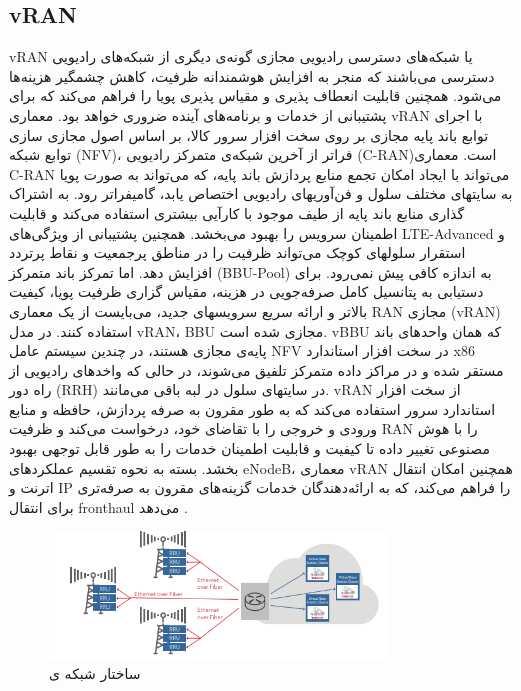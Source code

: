 \subsection{vRAN}
vRAN یا شبکه‌های دسترسی رادیویی مجازی
گونه‌ی دیگری از شبکه‌های رادیویی دسترسی می‌باشند که منجر به افزایش هوشمندانه ظرفیت، کاهش چشمگیر هزینه‌ها می‌شود. همچنین قابلیت انعطاف پذیری و مقیاس پذیری پویا را فراهم می‌کند که برای پشتیبانی از خدمات و برنامه‌های آینده ضروری خواهد بود.
معماری vRAN با اجرای توابع باند پایه مجازی بر روی سخت افزار سرور کالا، بر اساس اصول مجازی سازی توابع شبکه (NFV)، فراتر از آخرین شبکه‌ی  متمرکز رادیویی (C-RAN)است.
معماری C-RAN می‌تواند با ایجاد امکان تجمع منابع پردازش باند پایه، که می‌تواند به صورت پویا به سایتهای مختلف سلول و فن‌آوریهای رادیویی اختصاص یابد، گامیفراتر رود.
به اشتراک گذاری منابع باند پایه از طیف موجود با کارآیی بیشتری استفاده می‌کند و قابلیت اطمینان سرویس را بهبود می‌بخشد.
همچنین پشتیبانی از ویژگی‌های LTE-Advanced و استقرار سلولهای کوچک  می‌تواند ظرفیت را در مناطق پرجمعیت و نقاط پرتردد افزایش دهد.
اما تمرکز باند متمرکز (BBU-Pool) به اندازه کافی پیش نمی‌رود.
برای دستیابی به پتانسیل کامل صرفه‌جویی در هزینه، مقیاس گزاری ظرفیت پویا، کیفیت بالاتر و ارائه سریع سرویسهای جدید، می‌بایست از یک معماری RAN مجازی (vRAN) استفاده کنند. در مدل vRAN،
BBU 
مجازی شده است.
vBBU
که همان واحدهای باند پایه‌ی مجازی هستند، در چندین سیستم عامل NFV در سخت افزار استاندارد x86 مستقر شده و در مراکز داده متمرکز تلفیق می‌شوند، در حالی که واخدهای رادیویی از راه دور (RRH) در سایتهای سلول در لبه باقی می‌مانند.
vRAN 
از سخت افزار استاندارد سرور استفاده می‌کند که به طور مقرون به صرفه پردازش، حافظه و منابع ورودی و خروجی را با تقاضای خود، درخواست می‌کند و ظرفیت RAN را با هوش مصنوعی تغییر داده تا کیفیت و قابلیت اطمینان خدمات را به طور قابل توجهی بهبود بخشد.
بسته به نحوه تقسیم عملکردهای eNodeB، معماری vRAN همچنین امکان انتقال اترنت و IP را فراهم می‌کند، که به ارائه‌دهندگان خدمات گزینه‌های مقرون به صرفه‌تری برای انتقال fronthaul می‌دهد \cite{vran}.
\begin{figure}%
	\centering
	\includegraphics[width=0.8\textwidth]{./fig/vran}
	\caption{ساختار شبکه ی  \cite{vran}}
	\label{fig:vran}
\end{figure}

